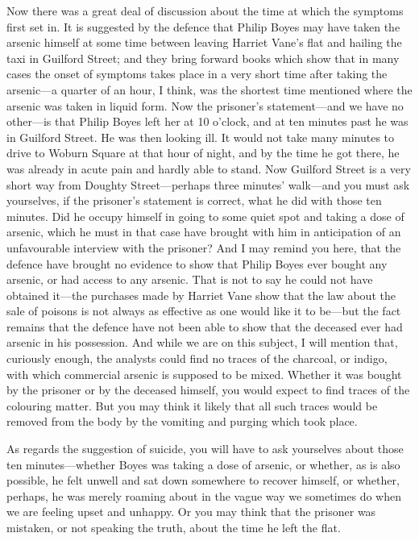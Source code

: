 Now there was a great deal of discussion about the time at which the symptoms first set in. It is suggested by the defence that Philip Boyes may have taken the arsenic himself at some time between leaving Harriet Vane's flat and hailing the taxi in Guilford Street; and they bring forward books which show that in many cases the onset of symptoms takes place in a very short time after taking the arsenic—a quarter of an hour, I think, was the shortest time mentioned where the arsenic was taken in liquid form. Now the prisoner's statement—and we have no other—is that Philip Boyes left her at 10 o'clock, and at ten minutes past he was in Guilford Street. He was then looking ill. It would not take many minutes to drive to Woburn Square at that hour of night, and by the time he got there, he was already in acute pain and hardly able to stand. Now Guilford Street is a very short way from Doughty Street—perhaps three minutes' walk—and you must ask yourselves, if the prisoner's statement is correct, what he did with those ten minutes. Did he occupy himself in going to some quiet spot and taking a dose of arsenic, which he must in that case have brought with him in anticipation of an unfavourable interview with the prisoner? And I may remind you here, that the defence have brought no evidence to show that Philip Boyes ever bought any arsenic, or had access to any arsenic. That is not to say he could not have obtained it—the purchases made by Harriet Vane show that the law about the sale of poisons is not always as effective as one would like it to be—but the fact remains that the defence have not been able to show that the deceased ever had arsenic in his possession. And while we are on this subject, I will mention that, curiously enough, the analysts could find no traces of the charcoal, or indigo, with which commercial arsenic is supposed to be mixed. Whether it was bought by the prisoner or by the deceased himself, you would expect to find traces of the colouring matter. But you may think it likely that all such traces would be removed from the body by the vomiting and purging which took place.

As regards the suggestion of suicide, you will have to ask yourselves about those ten minutes—whether Boyes was taking a dose of arsenic, or whether, as is also possible, he felt unwell and sat down somewhere to recover himself, or whether, perhaps, he was merely roaming about in the vague way we sometimes do when we are feeling upset and unhappy. Or you may think that the prisoner was mistaken, or not speaking the truth, about the time he left the flat.

